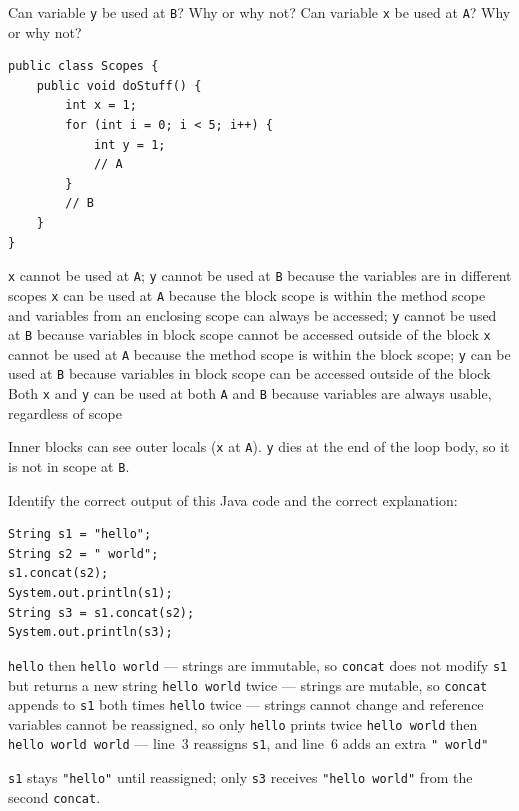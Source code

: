 \newpage

\question[4]
Can variable \texttt{y} be used at \texttt{B}? Why or why not? Can variable \texttt{x} be used at \texttt{A}? Why or why not?
\begin{lstlisting}[style=java]
public class Scopes {
    public void doStuff() {
        int x = 1;
        for (int i = 0; i < 5; i++) {
            int y = 1;
            // A
        }
        // B
    }
}
\end{lstlisting}
\begin{choices}
  \choice \texttt{x} cannot be used at \texttt{A}; \texttt{y} cannot be used at \texttt{B} because the variables are in different scopes
  \CorrectChoice \texttt{x} can be used at \texttt{A} because the block scope is within the method scope and variables from an enclosing scope can always be accessed; \texttt{y} cannot be used at \texttt{B} because variables in block scope cannot be accessed outside of the block
  \choice \texttt{x} cannot be used at \texttt{A} because the method scope is within the block scope; \texttt{y} can be used at \texttt{B} because variables in block scope can be accessed outside of the block
  \choice Both \texttt{x} and \texttt{y} can be used at both \texttt{A} and \texttt{B} because variables are always usable, regardless of scope
\end{choices}
\begin{solution}
  Inner blocks can see outer locals (\texttt{x} at \texttt{A}). \texttt{y} dies at the end of the loop body, so it is not in scope at \texttt{B}.
\end{solution}

\question[4]
Identify the correct output of this Java code and the correct explanation:
\begin{lstlisting}[style=java]
String s1 = "hello";
String s2 = " world";
s1.concat(s2);
System.out.println(s1);
String s3 = s1.concat(s2);
System.out.println(s3);
\end{lstlisting}
\begin{choices}
  \CorrectChoice \texttt{hello} then \texttt{hello world} --- strings are immutable, so \texttt{concat} does not modify \texttt{s1} but returns a new string
  \choice \texttt{hello world} twice --- strings are mutable, so \texttt{concat} appends to \texttt{s1} both times
  \choice \texttt{hello} twice --- strings cannot change and reference variables cannot be reassigned, so only \texttt{hello} prints twice
  \choice \texttt{hello world} then \texttt{hello world world} --- line~3 reassigns \texttt{s1}, and line~6 adds an extra \texttt{" world"}
\end{choices}
\begin{solution}
  \texttt{s1} stays \texttt{"hello"} until reassigned; only \texttt{s3} receives \texttt{"hello world"} from the second \texttt{concat}.
\end{solution}

